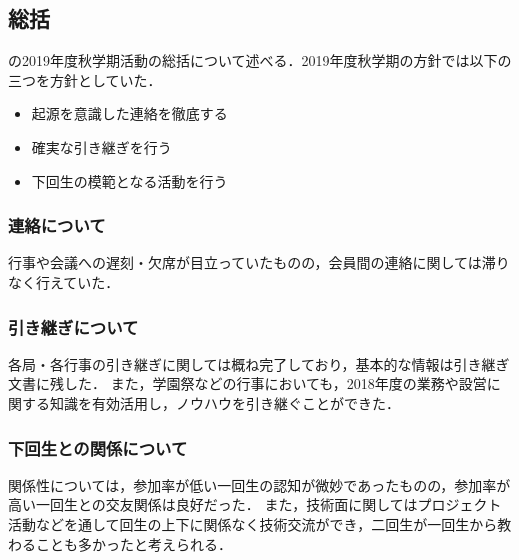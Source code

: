 \subsection*{\secondGrade{}総括}


\secondGrade{}の2019年度秋学期活動の総括について述べる．2019年度秋学期の方針では以下の三つを方針としていた．
\begin{itemize}
    \item 起源を意識した連絡を徹底する
    \item 確実な引き継ぎを行う
    \item 下回生の模範となる活動を行う

\end{itemize}

\subsubsection*{連絡について}
行事や会議への遅刻・欠席が目立っていたものの，会員間の連絡に関しては滞りなく行えていた． 
\subsubsection*{引き継ぎについて}
各局・各行事の引き継ぎに関しては概ね完了しており，基本的な情報は引き継ぎ文書に残した．
また，学園祭などの行事においても，2018年度の業務や設営に関する知識を有効活用し，ノウハウを引き継ぐことができた． 
\subsubsection*{下回生との関係について}
関係性については，参加率が低い一回生の認知が微妙であったものの，参加率が高い一回生との交友関係は良好だった．
また，技術面に関してはプロジェクト活動などを通して回生の上下に関係なく技術交流ができ，二回生が一回生から教わることも多かったと考えられる．